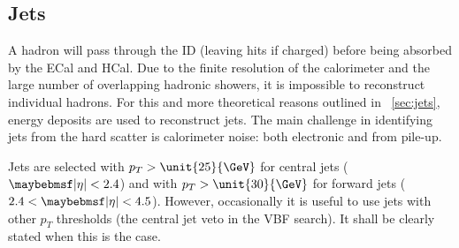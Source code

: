 \subsection{Jets}
\label{sec:objects:jets}

A hadron will pass through the \ac{ID} (leaving hits if charged) before being absorbed by 
the \ac{ECal} and \ac{HCal}. Due to the finite resolution of the calorimeter and the 
large number of overlapping hadronic showers, it is impossible to reconstruct individual 
hadrons. For this and more theoretical reasons outlined in \Section~\ref{sec:jets}, 
energy deposits are used to reconstruct jets. The main challenge in identifying jets from 
the hard scatter is calorimeter noise: both electronic and from pile-up.

Jets are selected with $p_T > \unit{25}{\GeV}$ for central jets ($\mods{\eta} < 2.4$) and 
with $p_T > \unit{30}{\GeV}$ for forward jets ($2.4 < \mods{\eta} < 4.5$). However, 
occasionally it is useful to use jets with other $p_T$ thresholds (\eg the central jet 
veto in the VBF search). It shall be clearly stated when this is the case.

